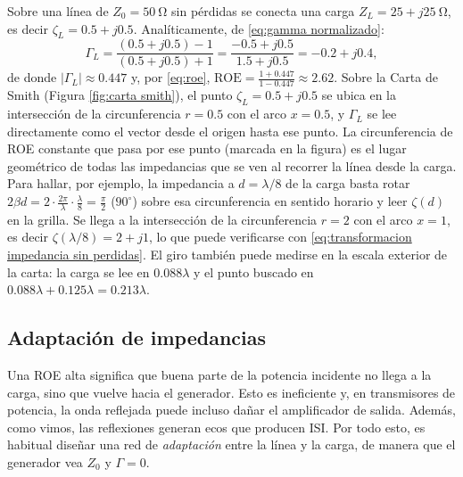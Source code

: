 \begin{ejemplo}\label{ejemplo:smith}
Sobre una línea de $Z_0=50\ \unit{\ohm}$ sin pérdidas se conecta una carga $Z_L=25+j25\ \unit{\ohm}$, es decir $\zeta_L=0.5+j0.5$. Analíticamente, de \eqref{eq:gamma normalizado}:
\begin{equation*}
    \Gamma_L = \frac{(0.5+j0.5)-1}{(0.5+j0.5)+1} = \frac{-0.5+j0.5}{1.5+j0.5} = -0.2+j0.4,
\end{equation*}
de donde $|\Gamma_L|\approx 0.447$ y, por \eqref{eq:roe}, $\mathrm{ROE}=\frac{1+0.447}{1-0.447}\approx 2.62$. Sobre la Carta de Smith (Figura \ref{fig:carta smith}), el punto $\zeta_L=0.5+j0.5$ se ubica en la intersección de la circunferencia $r=0.5$ con el arco $x=0.5$, y $\Gamma_L$ se lee directamente como el vector desde el origen hasta ese punto. La circunferencia de ROE constante que pasa por ese punto (marcada en la figura) es el lugar geométrico de todas las impedancias que se ven al recorrer la línea desde la carga. Para hallar, por ejemplo, la impedancia a $d=\lambda/8$ de la carga basta rotar $2\beta d = 2\cdot\frac{2\pi}{\lambda}\cdot\frac{\lambda}{8}=\frac{\pi}{2}$ ($90^\circ$) sobre esa circunferencia en sentido horario y leer $\zeta(d)$ en la grilla. Se llega a la intersección de la circunferencia $r=2$ con el arco $x=1$, es decir $\zeta(\lambda/8)=2+j1$, lo que puede verificarse con \eqref{eq:transformacion impedancia sin perdidas}. El giro también puede medirse en la escala exterior de la carta: la carga se lee en $0.088\lambda$ y el punto buscado en $0.088\lambda+0.125\lambda=0.213\lambda$.
\end{ejemplo}

\subsection*{Adaptación de impedancias}

Una ROE alta significa que buena parte de la potencia incidente no llega a la carga, sino que vuelve hacia el generador. Esto es ineficiente y, en transmisores de potencia, la onda reflejada puede incluso dañar el amplificador de salida. Además, como vimos, las reflexiones generan ecos que producen ISI. Por todo esto, es habitual diseñar una red de \emph{adaptación} entre la línea y la carga, de manera que el generador vea $Z_0$ y $\Gamma=0$.

